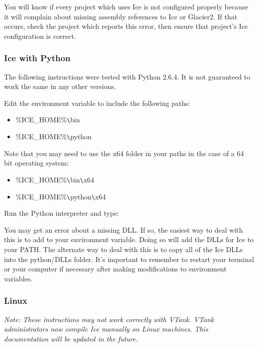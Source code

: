 You will know if every project which uses Ice is not configured properly because it will
complain about missing assembly references to Ice or Glacier2. If that occurs, check the project
which reports this error, then ensure that project's Ice configuration is correct.

\subsubsection*{Ice with Python}

The following instructions were tested with Python 2.6.4. It is not guaranteed to work the same
in any other versions.

Edit the  environment variable to include the following paths:

\begin{itemize}
\item \%ICE\_HOME\%\verb+\+bin
\item \%ICE\_HOME\%\verb+\+python
\end{itemize}

Note that you may need to use the x64 folder in your paths in the case of a 64 bit operating
system:

\begin{itemize}
\item \%ICE\_HOME\%\verb+\+bin\verb+\+x64
\item \%ICE\_HOME\%\verb+\+python\verb+\+x64
\end{itemize} 

Run the Python interpreter and type:


You may get an error about a missing DLL. If so, the easiest way to deal with this is to add
 to your  environment variable. Doing so will add the
DLLs for Ice to your PATH. The alternate way to deal with this is to copy all of the Ice DLLs
into the python/DLLs folder. It's important to remember to restart your terminal or your
computer if necessary after making modifications to environment variables.

\subsubsection*{Linux}

\emph{Note: These instructions may not work correctly with VTank. VTank administrators now
  compile Ice manually on Linux machines. This documentation will be updated in the future.}

